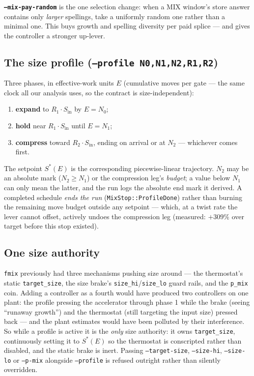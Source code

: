 \documentclass[11pt]{article}
\newcommand{\code}[1]{\texttt{#1}}
\begin{document}
\textbf{\code{--mix-pay-random}} is the one selection change: when a MIX
window's store answer contains only \emph{larger} spellings, take a
uniformly random one rather than a minimal one. This buys growth and
spelling diversity per paid splice --- and gives the controller a stronger
up-lever.

\subsection{The size profile (\code{--profile N0,N1,N2,R1,R2})}

Three phases, in effective-work units $E$ (cumulative moves per gate ---
the same clock all our analysis uses, so the contract is size-independent):

\begin{enumerate}
\item \textbf{expand} to $R_1 \cdot S_{\text{in}}$ by $E = N_0$;
\item \textbf{hold} near $R_1 \cdot S_{\text{in}}$ until $E = N_1$;
\item \textbf{compress} toward $R_2 \cdot S_{\text{in}}$, ending on arrival
or at $N_2$ --- whichever comes first.
\end{enumerate}

The setpoint $S^*(E)$ is the corresponding piecewise-linear trajectory.
$N_2$ may be an absolute mark ($N_2 \ge N_1$) or the compression leg's
\emph{budget}; a value below $N_1$ can only mean the latter, and the run
logs the absolute end mark it derived. A completed schedule \emph{ends the
run} (\code{MixStop::ProfileDone}) rather than burning the remaining move
budget outside any setpoint --- which, at a twist rate the lever cannot
offset, actively undoes the compression leg (measured: $+309\%$ over target
before this stop existed).

\subsection{One size authority}

\code{fmix} previously had three mechanisms pushing size around --- the
thermostat's static \code{target\_size}, the size brake's
\code{size\_hi}/\code{size\_lo} guard rails, and the \code{p\_mix} coin.
Adding a controller as a fourth would have produced two controllers on one
plant: the profile pressing the accelerator through phase 1 while the brake
(seeing ``runaway growth'') and the thermostat (still targeting the input
size) pressed back --- and the plant estimates would have been polluted by
their interference. So while a profile is active it is the \emph{only} size
authority: it owns \code{target\_size}, continuously setting it to
$S^*(E)$ so the thermostat is conscripted rather than disabled, and the
static brake is inert. Passing \code{--target-size}, \code{--size-hi},
\code{--size-lo} or \code{--p-mix} alongside \code{--profile} is refused
outright rather than silently overridden.
\end{document}
